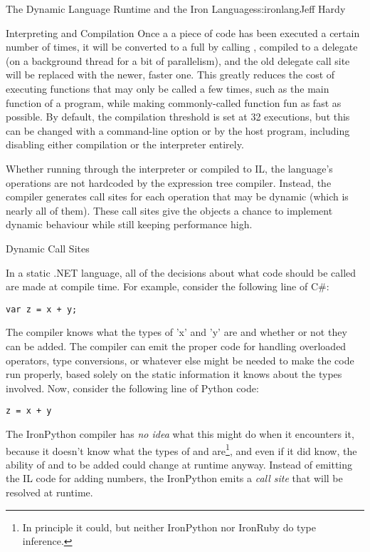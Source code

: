 \begin{aosachapter}{The Dynamic Language Runtime and the Iron Languages}{s:ironlang}{Jeff Hardy}
\begin{aosasect1}{Interpreting and Compilation}
Once a a piece of code has been executed a certain number of times, it
will be converted to a full  by calling
, compiled to a
 delegate (on a background thread for a bit of
parallelism), and the old delegate call site will be replaced with the
newer, faster one. This greatly reduces the cost of executing
functions that may only be called a few times, such as the main
function of a program, while making commonly-called function fun as
fast as possible. By default, the compilation threshold is set at 32
executions, but this can be changed with a command-line option or by
the host program, including disabling either compilation or the
interpreter entirely.

Whether running through the interpreter or compiled to IL, the
language's operations are not hardcoded by the expression tree
compiler. Instead, the compiler generates call sites for each
operation that may be dynamic (which is nearly all of them). These
call sites give the objects a chance to implement dynamic behaviour
while still keeping performance high.

\end{aosasect1}

\begin{aosasect1}{Dynamic Call Sites}

In a static .NET language, all of the decisions about what code should
be called are made at compile time. For example, consider the
following line of C\#:

\begin{verbatim}
var z = x + y;
\end{verbatim}

The compiler knows what the types of 'x' and 'y' are and whether or
not they can be added. The compiler can emit the proper code for
handling overloaded operators, type conversions, or whatever else
might be needed to make the code run properly, based solely on the
static information it knows about the types involved. Now, consider
the following line of Python code:

\begin{verbatim}
z = x + y
\end{verbatim}

The IronPython compiler has \emph{no idea} what this might do when it
encounters it, because it doesn't know what the types of  and
 are\footnote{In principle it could, but neither IronPython
  nor IronRuby do type inference.}, and even if it did know, the
ability of  and  to be added could change at runtime
anyway. Instead of emitting the IL code for adding numbers, the
IronPython emits a \emph{call site} that will be resolved at runtime.


\end{aosasect1}
\end{aosachapter}

